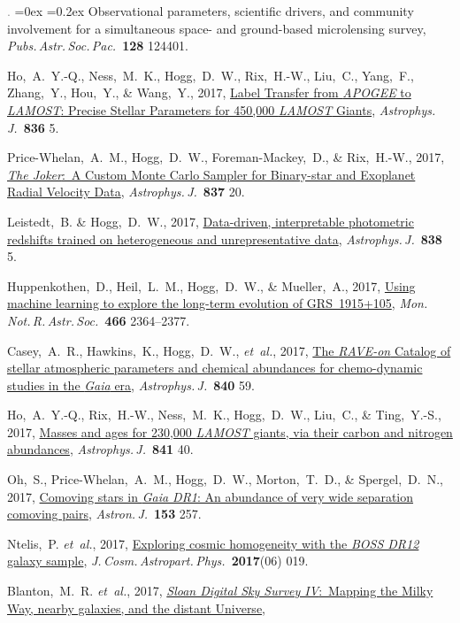 \documentclass[12pt,letterpaper]{article}
\newcommand{\latin}[1]{\textsl{#1}}
\newcommand{\etal}{\latin{et~al.}}
\newcommand{\satellite}[1]{\textsl{#1}}
\newcommand{\project}[1]{\textsl{#1}}
\newcommand{\doi}[2]{\href{http://dx.doi.org/#1}{{#2}}}
\newcommand{\deemph}[1]{\textcolor{grey}{\footnotesize{#1}}}
\newcommand{\pubnumber}[1]{\deemph{{#1}.}}
\newcounter{refpubnum}
\newcommand{\hogglist}{%
    \rightmargin=0in
    \leftmargin=0.18in
    \topsep=0ex
    \partopsep=0pt
    \itemsep=0.2ex
    \parsep=0pt
    \itemindent=-1.0\leftmargin
    \listparindent=0.0\leftmargin
    \settowidth{\labelsep}{~}
    \usecounter{refpubnum}
  }
\begin{document}
\begin{list}{\pubnumber{\therefpubnum}}{\hogglist}
{Observational parameters, scientific drivers, and community involvement
for a simultaneous space- and ground-based microlensing survey},
\textit{Pubs.\,Astr.\,Soc.\,Pac.}\ \textbf{128} 124401.
\item
Ho,~A.~Y.-Q., Ness,~M.~K., Hogg,~D.~W., Rix,~H.-W., Liu,~C., Yang,~F., Zhang,~Y.,
Hou,~Y., \& Wang,~Y., 2017,
\doi{10.3847/1538-4357/836/1/5}{Label Transfer from \project{APOGEE} to \project{LAMOST}: Precise Stellar Parameters for 450,000 \project{LAMOST} Giants},
\textit{Astrophys.\,J.}\ \textbf{836} 5.
\item
Price-Whelan,~A.~M., Hogg,~D.~W., Foreman-Mackey,~D., \& Rix,~H.-W., 2017,
\doi{10.3847/1538-4357/aa5e50}{\project{The Joker}:\ A Custom Monte Carlo Sampler for Binary-star and Exoplanet Radial Velocity Data},
\textit{Astrophys.\,J.}\ \textbf{837} 20.
\item
Leistedt,~B. \& Hogg,~D.~W., 2017,
\doi{10.3847/1538-4357/aa6332}{Data-driven, interpretable photometric redshifts trained on heterogeneous and unrepresentative data},
\textit{Astrophys.\,J.}\ \textbf{838} 5.
\item
Huppenkothen,~D., Heil,~L.~M., Hogg,~D.~W., \& Mueller,~A., 2017,
\doi{10.1093/mnras/stw3190}{Using machine learning to explore the long-term evolution of GRS~1915+105},
\textit{Mon.\,Not.\,R.\,Astr.\,Soc.}\ \textbf{466} 2364--2377.
\item
Casey,~A.~R., Hawkins,~K., Hogg,~D.~W., \etal, 2017,
\doi{10.3847/1538-4357/aa69c2}{The \project{RAVE-on} Catalog of stellar atmospheric parameters and chemical abundances for chemo-dynamic studies in the \satellite{Gaia} era},
\textit{Astrophys.\,J.}\ \textbf{840} 59.
\item
Ho,~A.~Y.-Q., Rix,~H.-W., Ness,~M.~K., Hogg,~D.~W., Liu,~C., \& Ting,~Y.-S., 2017,
\doi{10.3847/1538-4357/aa6db3}{Masses and ages for 230,000 \project{LAMOST} giants, via their carbon and nitrogen abundances},
\textit{Astrophys.\,J.}\ \textbf{841} 40.
\item
Oh,~S., Price-Whelan,~A.~M., Hogg,~D.~W., Morton,~T.~D., \& Spergel,~D.~N., 2017,
\doi{10.3847/1538-3881/aa6ffd}{Comoving stars in \project{Gaia DR1}: An abundance of very wide separation comoving pairs},
\textit{Astron.\,J.}\ \textbf{153} 257.
\item
Ntelis,~P. \etal, 2017,
\doi{10.1088/1475-7516/2017/06/019}{Exploring cosmic homogeneity with the \project{BOSS DR12} galaxy sample},
\textit{J.\,Cosm.\,Astropart.\,Phys.}\ \textbf{2017}(06) 019.
\item
Blanton,~M.~R. \etal, 2017,
\doi{10.3847/1538-3881/aa7567}{\project{Sloan Digital Sky Survey IV}:\ Mapping the Milky Way, nearby galaxies, and the distant Universe},

\end{list}
\end{document}
